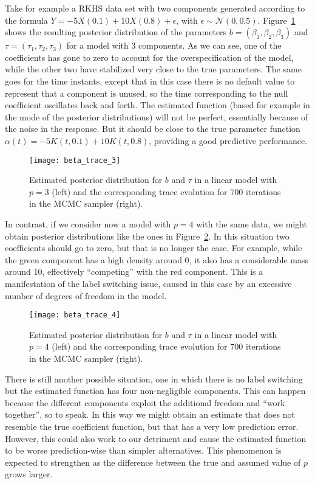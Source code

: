 Take for example a RKHS data set with two components generated according to the formula \(Y=-5X(0.1) + 10X(0.8) + \epsilon\), with \(\epsilon\sim \mathcal N(0, 0.5)\). Figure~\ref{fig:beta_trace_3} shows the resulting posterior distribution of the parameters \(b=(\beta_1, \beta_2, \beta_3)\) and \(\tau=(\tau_1, \tau_2, \tau_3)\) for a model with 3 components. As we can see, one of the coefficients has gone to zero to account for the overspecification of the model, while the other two have stabilized very close to the true parameters. The same goes for the time instants, except that in this case there is no default value to represent that a component is unused, so the time corresponding to the null coefficient oscillates back and forth. The estimated function (based for example in the mode of the posterior distributions) will not be perfect, essentially because of the noise in the response. But it should be close to the true parameter function \(\alpha(t)=-5K(t, 0.1) + 10K(t, 0.8)\), providing a good predictive performance.

\begin{figure}[ht!]
  \centering
  \texttt{[image: beta\_trace\_3]}
  \caption{Estimated posterior distribution for \(b\) and \(\tau\) in a linear model with \(p=3\) (left) and the corresponding trace evolution for 700 iterations in the MCMC sampler (right).}\label{fig:beta_trace_3}
\end{figure}

In contrast, if we consider now a model with \(p=4\) with the same data, we might obtain posterior distributions like the ones in Figure~\ref{fig:beta_trace_4}. In this situation two coefficients should go to zero, but that is no longer the case. For example, while the green component has a high density around 0, it also has a considerable mass around 10, effectively ``competing'' with the red component. This is a manifestation of the label switching issue, caused in this case by an excessive number of degrees of freedom in the model.

\begin{figure}[ht!]
  \centering
  \texttt{[image: beta\_trace\_4]}
  \caption{Estimated posterior distribution for \(b\) and \(\tau\) in a linear model with \(p=4\) (left) and the corresponding trace evolution for 700 iterations in the MCMC sampler (right).}\label{fig:beta_trace_4}
\end{figure}

There is still another possible situation, one in which there is no label switching but the estimated function has four non-negligible components. This can happen because the different components exploit the additional freedom and ``work together'', so to speak. In this way we might obtain an estimate that does not resemble the true coefficient function, but that has a very low prediction error. However, this could also work to our detriment and cause the estimated function to be worse prediction-wise than simpler alternatives. This phenomenon is expected to strengthen as the difference between the true and assumed value of \(p\) grows larger.


